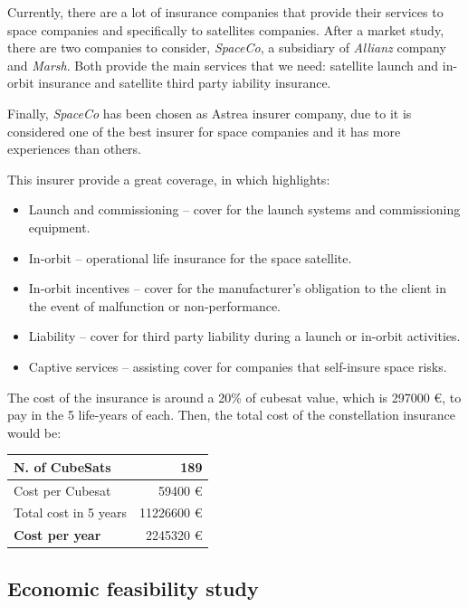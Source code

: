 Currently, there are a lot of insurance companies that provide their services to space companies and specifically to  satellites companies. After a market study, there are two companies to consider, \textit{SpaceCo}, a subsidiary of \textit{Allianz} company and \textit{Marsh}. Both provide the main services that we need: satellite launch and in-orbit insurance and satellite third party iability insurance.

Finally, \textit{SpaceCo} has been chosen as Astrea insurer company, due to it is considered one of the best insurer for space companies and it has more experiences than others.

This insurer provide a great coverage, in which highlights:

\begin{itemize}

	\item Launch and commissioning – cover for the launch systems and commissioning equipment.
	\item In-orbit – operational life insurance for the space satellite.
	\item In-orbit incentives – cover for the manufacturer’s obligation to the client in the event of malfunction 		          or non-performance.
	\item Liability – cover for third party liability during a launch or in-orbit activities.
	\item Captive services – assisting cover for companies that self-insure space risks. \cite{allianz}

\end{itemize}

The cost of the insurance is around a 20\% of cubesat value, which is 297000 \euro, to pay in the 5 life-years of each. Then, the total cost of the constellation insurance would be:

\begin{longtable}{| l | r |}
  \hline
	N. of CubeSats & 189 \\
  \hline
    Cost per Cubesat & 59400 \euro  \\
  \hline
    Total cost in 5 years & 11226600 \euro \\
  \hline
  	\textbf{Cost per year} & 2245320 \euro \\
  \hline

\end{longtable}

\subsection{Economic feasibility study}

